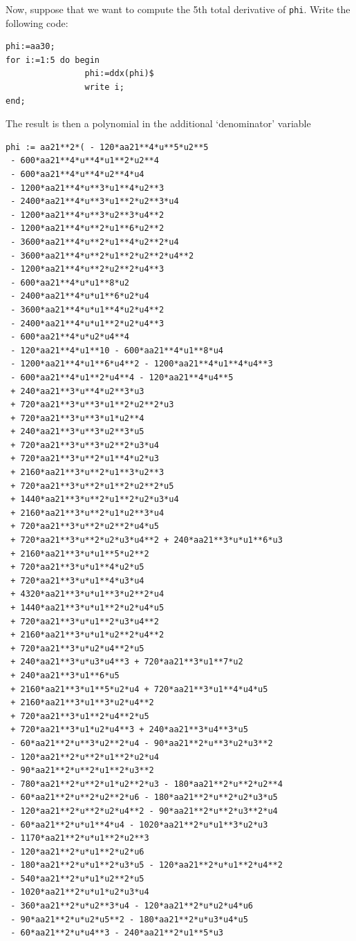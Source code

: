 Now, suppose that we want to compute the 5th total derivative of
\texttt{phi}. Write the following code:
\begin{verbatim}
phi:=aa30;
for i:=1:5 do begin
                phi:=ddx(phi)$
                write i;
end;
\end{verbatim}
The result is then a polynomial in the additional `denominator' variable
\begin{verbatim}
phi := aa21**2*( - 120*aa21**4*u**5*u2**5
 - 600*aa21**4*u**4*u1**2*u2**4
 - 600*aa21**4*u**4*u2**4*u4
 - 1200*aa21**4*u**3*u1**4*u2**3
 - 2400*aa21**4*u**3*u1**2*u2**3*u4
 - 1200*aa21**4*u**3*u2**3*u4**2
 - 1200*aa21**4*u**2*u1**6*u2**2
 - 3600*aa21**4*u**2*u1**4*u2**2*u4
 - 3600*aa21**4*u**2*u1**2*u2**2*u4**2
 - 1200*aa21**4*u**2*u2**2*u4**3
 - 600*aa21**4*u*u1**8*u2
 - 2400*aa21**4*u*u1**6*u2*u4
 - 3600*aa21**4*u*u1**4*u2*u4**2
 - 2400*aa21**4*u*u1**2*u2*u4**3
 - 600*aa21**4*u*u2*u4**4
 - 120*aa21**4*u1**10 - 600*aa21**4*u1**8*u4
 - 1200*aa21**4*u1**6*u4**2 - 1200*aa21**4*u1**4*u4**3
 - 600*aa21**4*u1**2*u4**4 - 120*aa21**4*u4**5
 + 240*aa21**3*u**4*u2**3*u3
 + 720*aa21**3*u**3*u1**2*u2**2*u3
 + 720*aa21**3*u**3*u1*u2**4
 + 240*aa21**3*u**3*u2**3*u5
 + 720*aa21**3*u**3*u2**2*u3*u4
 + 720*aa21**3*u**2*u1**4*u2*u3
 + 2160*aa21**3*u**2*u1**3*u2**3
 + 720*aa21**3*u**2*u1**2*u2**2*u5
 + 1440*aa21**3*u**2*u1**2*u2*u3*u4
 + 2160*aa21**3*u**2*u1*u2**3*u4
 + 720*aa21**3*u**2*u2**2*u4*u5
 + 720*aa21**3*u**2*u2*u3*u4**2 + 240*aa21**3*u*u1**6*u3
 + 2160*aa21**3*u*u1**5*u2**2
 + 720*aa21**3*u*u1**4*u2*u5
 + 720*aa21**3*u*u1**4*u3*u4
 + 4320*aa21**3*u*u1**3*u2**2*u4
 + 1440*aa21**3*u*u1**2*u2*u4*u5
 + 720*aa21**3*u*u1**2*u3*u4**2
 + 2160*aa21**3*u*u1*u2**2*u4**2
 + 720*aa21**3*u*u2*u4**2*u5
 + 240*aa21**3*u*u3*u4**3 + 720*aa21**3*u1**7*u2
 + 240*aa21**3*u1**6*u5
 + 2160*aa21**3*u1**5*u2*u4 + 720*aa21**3*u1**4*u4*u5
 + 2160*aa21**3*u1**3*u2*u4**2
 + 720*aa21**3*u1**2*u4**2*u5
 + 720*aa21**3*u1*u2*u4**3 + 240*aa21**3*u4**3*u5
 - 60*aa21**2*u**3*u2**2*u4 - 90*aa21**2*u**3*u2*u3**2
 - 120*aa21**2*u**2*u1**2*u2*u4
 - 90*aa21**2*u**2*u1**2*u3**2
 - 780*aa21**2*u**2*u1*u2**2*u3 - 180*aa21**2*u**2*u2**4
 - 60*aa21**2*u**2*u2**2*u6 - 180*aa21**2*u**2*u2*u3*u5
 - 120*aa21**2*u**2*u2*u4**2 - 90*aa21**2*u**2*u3**2*u4
 - 60*aa21**2*u*u1**4*u4 - 1020*aa21**2*u*u1**3*u2*u3
 - 1170*aa21**2*u*u1**2*u2**3
 - 120*aa21**2*u*u1**2*u2*u6
 - 180*aa21**2*u*u1**2*u3*u5 - 120*aa21**2*u*u1**2*u4**2
 - 540*aa21**2*u*u1*u2**2*u5
 - 1020*aa21**2*u*u1*u2*u3*u4
 - 360*aa21**2*u*u2**3*u4 - 120*aa21**2*u*u2*u4*u6
 - 90*aa21**2*u*u2*u5**2 - 180*aa21**2*u*u3*u4*u5
 - 60*aa21**2*u*u4**3 - 240*aa21**2*u1**5*u3

\end{verbatim}
